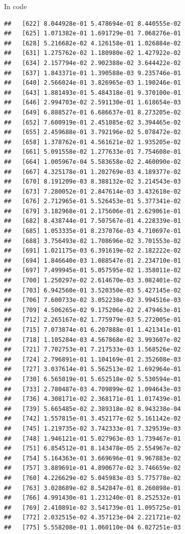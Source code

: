 \documentclass[ignorenonframetext,]{beamer}
\begin{document}
\begin{frame}[fragile]{In code}
\begin{verbatim}
##   [622] 8.044928e-01 5.478694e-01 8.440555e-02
##   [625] 1.071382e-01 1.691729e-01 7.068276e-01
##   [628] 5.216682e-02 4.126158e-01 1.026884e-02
##   [631] 1.275762e-02 1.180980e-02 1.427922e-02
##   [634] 2.157794e-02 2.902388e-02 3.644422e-02
##   [637] 1.843371e-01 1.390588e-03 9.235746e-01
##   [640] 2.566024e-01 3.826965e-03 1.190246e-01
##   [643] 1.881493e-01 5.484318e-01 9.370100e-01
##   [646] 2.994703e-02 2.591130e-01 1.618654e-03
##   [649] 6.888527e-01 6.686637e-01 8.273205e-02
##   [652] 7.600919e-01 2.451085e-02 3.394465e-02
##   [655] 2.459688e-01 3.792196e-02 5.078472e-02
##   [658] 1.378762e-01 4.561621e-02 1.935205e-02
##   [661] 5.091558e-02 1.277633e-01 7.754608e-01
##   [664] 1.005967e-04 5.583658e-02 2.460090e-02
##   [667] 4.325178e-01 1.202769e-03 4.189377e-02
##   [670] 8.191209e-03 8.388132e-02 3.214543e-03
##   [673] 7.280052e-01 2.847614e-03 3.432618e-02
##   [676] 2.712965e-01 5.526453e-01 5.377341e-02
##   [679] 3.182968e-01 2.175606e-01 2.629061e-01
##   [682] 8.438744e-01 7.507567e-01 4.228339e-01
##   [685] 1.053335e-01 8.237076e-03 4.710697e-01
##   [688] 3.756493e-02 1.708696e-02 3.701553e-02
##   [691] 1.021175e-03 6.391619e-02 2.182222e-02
##   [694] 1.846640e-03 1.088547e-01 2.234710e-01
##   [697] 7.499945e-01 5.057595e-02 1.358011e-02
##   [700] 1.250297e-02 2.614670e-03 3.082401e-02
##   [703] 6.942560e-01 3.520350e-03 5.427145e-02
##   [706] 7.600733e-02 3.052238e-02 3.994516e-03
##   [709] 4.506265e-02 9.175206e-02 2.479463e-01
##   [712] 2.265167e-02 1.775979e-03 5.272005e-01
##   [715] 7.073874e-01 6.207888e-01 1.421341e-01
##   [718] 1.105284e-03 4.567868e-02 3.993607e-02
##   [721] 7.702753e-01 7.217533e-03 1.568526e-02
##   [724] 2.796891e-01 1.104169e-01 2.352608e-03
##   [727] 3.037614e-01 5.562513e-02 1.692964e-01
##   [730] 6.565019e-01 5.652518e-02 5.530594e-01
##   [733] 2.780487e-03 4.709899e-02 1.094643e-03
##   [736] 4.308171e-02 2.368171e-01 1.017439e-01
##   [739] 5.665485e-02 2.389318e-02 8.943238e-04
##   [742] 1.557815e-01 3.452177e-02 5.161142e-02
##   [745] 1.219735e-02 3.742333e-01 7.329539e-03
##   [748] 1.946121e-01 5.027963e-03 1.739467e-01
##   [751] 6.854512e-01 8.143478e-05 2.554967e-02
##   [754] 5.164363e-01 3.669696e-01 9.967883e-02
##   [757] 3.889691e-01 4.890677e-02 3.746659e-02
##   [760] 4.226629e-02 5.045983e-03 5.775778e-02
##   [763] 3.028689e-02 8.542847e-01 8.260898e-01
##   [766] 4.991430e-01 1.231240e-01 8.252532e-01
##   [769] 2.410891e-02 3.541739e-01 1.095725e-01
##   [772] 2.032515e-02 4.357123e-04 2.221721e-02
##   [775] 5.558208e-01 1.060110e-04 6.027251e-03

\end{verbatim}
\end{frame}
\end{document}
